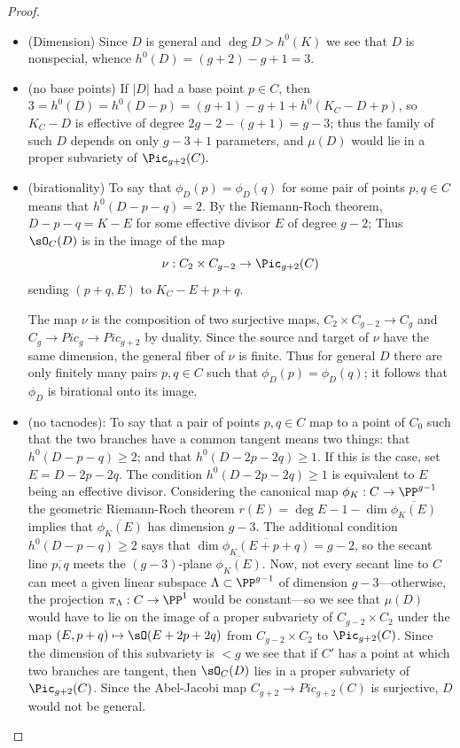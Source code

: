 \begin{proof}
\begin{itemize}

\item (Dimension) Since $D$ is general and $\deg D > h^{0}(K)$ we see that $D$ is nonspecial, whence $h^0(D) = (g+2)-g+1 = 3.$

\item (no base points) If $|D|$ had a base point $p\in C$, then $3=h^0(D) = h^0(D-p) = (g+1)-g+1+h^0(K_C-D+p)$,
so $K_C-D$ is effective of degree $2g-2-(g+1) =g-3$; thus the family of such $D$ depends on only $g-3+1$ parameters,
and $\mu(D)$ would lie in a proper subvariety of $\Pic_{g+2}(C).$

\item (birationality)
 To say that $\phi_D(p) = \phi_D(q)$ for some pair of points $p, q \in C$   means that $h^0(D-p-q) = 2$. By the Riemann-Roch
 theorem, $D-p-q = K-E$ for some effective divisor $E$ of degree $g-2$; Thus $\sO_C(D)$ is in the image of the map
$$
\nu : C_2 \times C_{g-2} \to \Pic_{g+2}(C)
$$
sending $(p+q, E)$ to $K_C - E + p + q$. 

The map $\nu$ is 
the composition of two surjective maps, $C_2 \times C_{g-2} \to C_g$ and $C_g\to Pic_g \to Pic_{g+2}$ by duality. Since the source and target of $\nu$ have the same dimension, the general fiber of $\nu$ is finite. Thus for general $D$  there are only finitely many pairs $p, q \in C$ such that $\phi_D(p) = \phi_D(q)$; it follows that $\phi_D$ is birational onto its image.


\item (no tacnodes):  To say that a pair of points $p, q \in C$ map to a point of $C_0$ such that the 
two branches have a common tangent means two things: that $h^0(D-p-q) \geq 2$; and that $h^0(D-2p-2q) \geq 1$. If this is the case, set $E = D - 2p - 2q$.  The condition $h^0(D-2p-2q) \geq 1$ is equivalent to  $E$ being an effective divisor. Considering the canonical map $\phi_K: C\to \PP^{g-1}$ 
the geometric Riemann-Roch theorem $r(E) = \deg E -1-\dim\overline{\phi_K(E)}$ implies that $\overline {\phi_K(E)}$ has dimension $g-3$. The additional condition $h^0(D-p-q) \geq 2$ says that $\dim\overline{\phi_K(E+p+q)} = g-2$,
so the secant line $\overline{p,q}$ meets the $(g-3)$-plane $\overline{\phi_K(E)}$. Now, not every secant line to $C$ can meet a given linear subspace $\Lambda \subset \PP^{g-1}$ of dimension $g-3$---otherwise, the projection $\pi_\Lambda : C \to \PP^1$ would be constant---so we see that $\mu(D)$ would have to lie on the image of a proper subvariety of $C_{g-2} \times C_2$ under the map $(E, p+q) \mapsto \sO(E+2p+2q)$ from $C_{g-2} \times C_2$ to $\Pic_{g+2}(C)$.
Since the dimension of this subvariety is $<g$ we see that if $C'$ has
a point at which two branches are tangent, then $\sO_C(D)$ lies in a proper subvariety of $\Pic_{g+2}(C)$. Since
the Abel-Jacobi map $C_{g+2} \to Pic_{g+2}(C)$ is surjective,
 $D$ would not be general. 
 


\end{itemize}
\end{proof}
